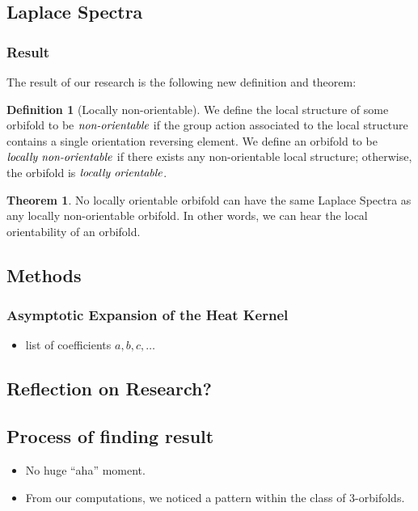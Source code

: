 \documentclass{article}[11pt]
\theoremstyle{definition}
\newtheorem{theorem}{Theorem}
\newtheorem{definition}{Definition}
\begin{document}
\subsection{Laplace Spectra}

\subsubsection{Result}
The result of our research is the following new definition and theorem:
\begin{definition}[Locally non-orientable]
    We define the local structure of some orbifold to be
    $\emph{non-orientable}$ if the group action associated to the local
    structure contains a single orientation reversing element. We define an
    orbifold to be $\emph{locally non-orientable}$ if there exists any
    non-orientable local structure; otherwise, the orbifold is
    $\emph{locally orientable}$.
\end{definition}
\begin{theorem}
    No locally orientable orbifold can have the same Laplace Spectra as
    any locally non-orientable orbifold. In other words, we can hear the
    local orientability of an orbifold. 
\end{theorem}

\subsection{Methods}

\subsubsection{Asymptotic Expansion of the Heat Kernel}

\begin{itemize}
    \item list of coefficients $a,b,c,\dots$
\end{itemize}

\subsection{Reflection on Research?}
\subsection{Process of finding result}
\begin{itemize}
    \item No huge ``aha'' moment.
    \item From our computations, we noticed a pattern within the class of
        3-orbifolds.
\end{itemize}
\end{document}
